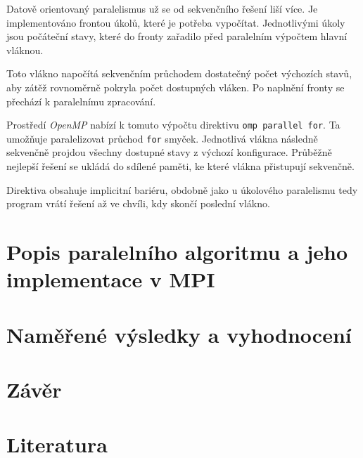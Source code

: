 \documentclass[czech]{article}
\begin{document}
Datově orientovaný paralelismus už se od sekvenčního řešení liší více.
Je implementováno frontou úkolů, které je potřeba vypočítat.
Jednotlivými úkoly jsou počáteční stavy, které do fronty zařadilo před paralelním výpočtem hlavní vláknou.

Toto vlákno napočítá sekvenčním průchodem dostatečný počet výchozích stavů, aby zátěž rovnoměrně pokryla počet dostupných vláken.
Po naplnění fronty se přechází k paralelnímu zpracování.

Prostředí \textit{OpenMP} nabízí k tomuto výpočtu direktivu \texttt{omp parallel for}.
Ta umožňuje paralelizovat průchod \texttt{for} smyček.
Jednotlivá vlákna následně sekvenčně projdou všechny dostupné stavy z výchozí konfigurace.
Průběžně nejlepší řešení se ukládá do sdílené paměti, ke které vlákna přistupují sekvenčně.

Direktiva obsahuje implicitní bariéru, obdobně jako u úkolového paralelismu tedy program vrátí řešení až ve chvíli, kdy skončí poslední vlákno.

\section{Popis paralelního algoritmu a jeho implementace v MPI}

\section{Naměřené výsledky a vyhodnocení}

\section{Závěr}

\section{Literatura}

\appendix
\end{document}
